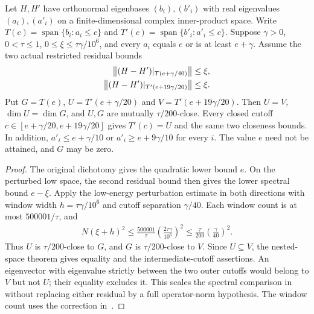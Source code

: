 \begin{theorem}
    \label{thm:scaled_restricted_residual_cluster}
    \leanok
    Let $H,H'$ have orthonormal eigenbases $(b_i),(b'_i)$ with real
    eigenvalues $(a_i),(a'_i)$ on a finite-dimensional complex inner-product
    space. Write $T(c)=\operatorname{span}\{b_i:a_i\le c\}$ and
    $T'(c)=\operatorname{span}\{b'_i:a'_i\le c\}$.
    Suppose $\gamma>0$, $0<\tau\le1$, $0\le\xi\le\tau\gamma/10^6$, and
    every $a_i$ equals $e$ or is at least $e+\gamma$. Assume the two actual
    restricted residual bounds
    \begin{align}
        \bigl\|(H-H')|_{T(e+\gamma/40)}\bigr\|    & \le\xi,\notag \\
        \bigl\|(H-H')|_{T'(e+19\gamma/20)}\bigr\| & \le\xi.
    \end{align}
    Put $G=T(e)$, $U=T'(e+\gamma/20)$ and $V=T'(e+19\gamma/20)$.
    Then $U=V$, $\dim U=\dim G$, and $U,G$ are mutually $\tau/200$-close.
    Every closed cutoff $c\in[e+\gamma/20,e+19\gamma/20]$ gives
    $T'(c)=U$ and the same two closeness bounds. In addition,
    $a'_i\le e+\gamma/10$ or $a'_i\ge e+9\gamma/10$ for every $i$.
    The value $e$ need not be attained, and $G$ may be zero.
\end{theorem}
\begin{proof}\leanok
    The original dichotomy gives the quadratic lower bound $e$.
    On the perturbed low space, the second residual bound then gives the
    lower spectral bound $e-\xi$. Apply the low-energy perturbation estimate
    in both directions with window width $h=\tau\gamma/10^6$ and cutoff
    separation $\gamma/40$. Each window count is at most $500001/\tau$, and
    \begin{align}
        N(\xi+h)^2
        \le\frac{500001}{\tau}\left(\frac{2\tau\gamma}{10^6}\right)^2
        \le\frac{\tau}{200}\left(\frac{\gamma}{40}\right)^2.
    \end{align}
    Thus $U$ is $\tau/200$-close to $G$, and $G$ is $\tau/200$-close to $V$.
    Since $U\subseteq V$, the nested-space theorem gives equality and the
    intermediate-cutoff assertions. An eigenvector with eigenvalue strictly
    between the two outer cutoffs would belong to $V$ but not $U$;
    their equality excludes it. This scales the spectral comparison in
    \cite[lines 955--968 and 1010--1024]{Arad2016RigorousRG} without
    replacing either residual by a full operator-norm hypothesis. The window
    count uses the correction in~\cite{gap:alvv16_hard_truncation_windows}.
\end{proof}

